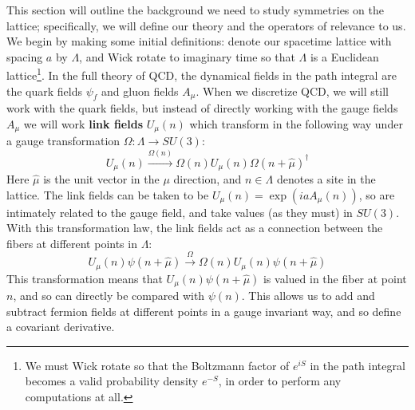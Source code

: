 \documentclass[11pt, oneside]{article}   	%
\theoremstyle{definition}
\begin{document}
This section will outline the background we need to study symmetries on the lattice; specifically, we will define our theory and the 
operators of relevance to us. We begin by making some initial definitions: denote our spacetime lattice with spacing $a$ by $\Lambda$, and Wick rotate to 
imaginary time so that $\Lambda$ is a Euclidean lattice\footnote{We must Wick rotate so that the Boltzmann factor of $e^{iS}$ in the 
path integral becomes a valid probability density $e^{-S}$, in order to perform any computations at all.}. In the full theory 
of QCD, the dynamical fields in the path integral are the quark fields $\psi_f$ and gluon fields $A_\mu$. When we 
discretize QCD, we will still work with the quark fields, but instead of directly working with the gauge fields $A_\mu$ we will work 
\textbf{link fields} $U_\mu(n)$ which transform in the following way under a gauge transformation $\Omega : \Lambda\rightarrow 
SU(3)$:
\begin{equation}
	U_\mu(n)\xrightarrow{\Omega(n)}\Omega(n) U_\mu(n)\Omega(n + \hat{\mu})^\dagger
\end{equation}
Here $\hat{\mu}$ is the unit vector in the $\mu$ direction, and $n\in\Lambda$ denotes a site in the lattice. The link fields can be taken 
to be $U_\mu(n) = \exp(ia A_\mu(n))$, so are intimately related to the gauge field, and take values (as they must) in $SU(3)$. 
With this transformation law, the link fields act as a connection between the fibers at different points in $\Lambda$:
\begin{equation}
	U_\mu(n)\psi(n + \hat{\mu})\xrightarrow{\Omega} \Omega(n) U_\mu(n)\psi(n + \hat{\mu})
\end{equation}
This transformation means that $U_\mu(n)\psi(n + \hat\mu)$ is valued in the fiber at point $n$, and so can directly be compared with 
$\psi(n)$. This allows us to add and subtract fermion fields at different points in a gauge invariant way, and so define a covariant derivative. 
\end{document}
